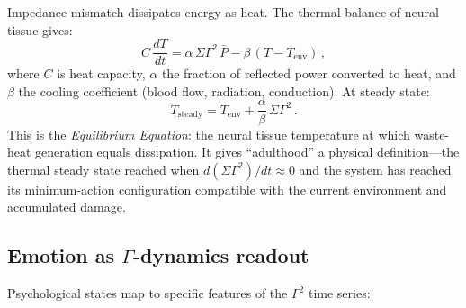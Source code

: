 ﻿\documentclass[aps,pre,twocolumn,superscriptaddress,floatfix]{revtex4-2}
\begin{document}
Impedance mismatch dissipates energy as heat.
The thermal balance of neural tissue gives:
\begin{equation}
  C\,\frac{dT}{dt} = \alpha\,\Sigma\Gamma^2\,\bar{P}
    - \beta\,(T - T_{\mathrm{env}})\,,
  \label{eq:thermal}
\end{equation}
where $C$ is heat capacity, $\alpha$ the fraction of
reflected power converted to heat, and $\beta$ the
cooling coefficient (blood flow, radiation, conduction).
At steady state:
\begin{equation}
  T_{\mathrm{steady}} = T_{\mathrm{env}}
    + \frac{\alpha}{\beta}\,\Sigma\Gamma^2\,.
  \label{eq:equilibrium}
\end{equation}
This is the \emph{Equilibrium Equation}:
the neural tissue temperature at which
waste-heat generation equals dissipation.
It gives ``adulthood'' a physical definition---the
thermal steady state reached when
$d(\Sigma\Gamma^2)/dt \approx 0$ and the system
has reached its minimum-action configuration
compatible with the current environment and
accumulated damage.


\subsection{Emotion as $\Gamma$-dynamics readout}
\label{sec:emotion}

Psychological states map to specific features
of the $\Gamma^2$ time series:
\end{document}
